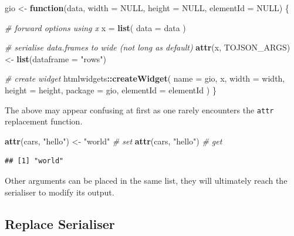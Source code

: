 \documentclass[
]{krantz}
\makeatletter
\newenvironment{Shaded}{\begin{snugshade}}{\end{snugshade}}
\newcommand{\CommentTok}[1]{\textcolor[rgb]{0.37,0.37,0.37}{\textit{#1}}}
\newcommand{\ControlFlowTok}[1]{\textcolor[rgb]{0.27,0.27,0.27}{\textbf{#1}}}
\newcommand{\DataTypeTok}[1]{\textcolor[rgb]{0.27,0.27,0.27}{#1}}
\newcommand{\KeywordTok}[1]{\textcolor[rgb]{0.27,0.27,0.27}{\textbf{#1}}}
\newcommand{\NormalTok}[1]{#1}
\newcommand{\OperatorTok}[1]{\textcolor[rgb]{0.43,0.43,0.43}{\textbf{#1}}}
\newcommand{\OtherTok}[1]{\textcolor[rgb]{0.37,0.37,0.37}{#1}}
\newcommand{\StringTok}[1]{\textcolor[rgb]{0.5,0.5,0.5}{#1}}
\newenvironment{kframe}{%
\medskip{}
\setlength{\fboxsep}{.8em}
 \def\at@end@of@kframe{}%
 \ifinner\ifhmode%
  \def\at@end@of@kframe{\end{minipage}}%
  \begin{minipage}{\columnwidth}%
 \fi\fi%
 \def\FrameCommand##1{\hskip\@totalleftmargin \hskip-\fboxsep
 \colorbox{shadecolor}{##1}\hskip-\fboxsep
     \hskip-\linewidth \hskip-\@totalleftmargin \hskip\columnwidth}%
 \MakeFramed {\advance\hsize-\width
   \@totalleftmargin\z@ \linewidth\hsize
   \@setminipage}}%
 {\par\unskip\endMakeFramed%
 \at@end@of@kframe}
\renewenvironment{Shaded}{\begin{kframe}}{\end{kframe}}
\makeatother
\begin{document}
\begin{Shaded}
\begin{Highlighting}[]
\NormalTok{gio <{-}}\StringTok{ }\ControlFlowTok{function}\NormalTok{(data, }\DataTypeTok{width =} \OtherTok{NULL}\NormalTok{, }\DataTypeTok{height =} \OtherTok{NULL}\NormalTok{, }
  \DataTypeTok{elementId =} \OtherTok{NULL}\NormalTok{) \{}

  \CommentTok{\# forward options using x}
\NormalTok{  x =}\StringTok{ }\KeywordTok{list}\NormalTok{(}
    \DataTypeTok{data =}\NormalTok{ data}
\NormalTok{  )}

  \CommentTok{\# serialise data.frames to wide (not long as default)}
  \KeywordTok{attr}\NormalTok{(x, }\StringTok{\textquotesingle{}TOJSON\_ARGS\textquotesingle{}}\NormalTok{) <{-}}\StringTok{ }\KeywordTok{list}\NormalTok{(}\DataTypeTok{dataframe =} \StringTok{"rows"}\NormalTok{)}

  \CommentTok{\# create widget}
\NormalTok{  htmlwidgets}\OperatorTok{::}\KeywordTok{createWidget}\NormalTok{(}
    \DataTypeTok{name =} \StringTok{\textquotesingle{}gio\textquotesingle{}}\NormalTok{,}
\NormalTok{    x,}
    \DataTypeTok{width =}\NormalTok{ width,}
    \DataTypeTok{height =}\NormalTok{ height,}
    \DataTypeTok{package =} \StringTok{\textquotesingle{}gio\textquotesingle{}}\NormalTok{,}
    \DataTypeTok{elementId =}\NormalTok{ elementId}
\NormalTok{  )}
\NormalTok{\}}
\end{Highlighting}
\end{Shaded}

The above may appear confusing at first as one rarely encounters the \texttt{attr} replacement function.

\begin{Shaded}
\begin{Highlighting}[]
\KeywordTok{attr}\NormalTok{(cars, }\StringTok{"hello"}\NormalTok{) <{-}}\StringTok{ "world"} \CommentTok{\# set }
\KeywordTok{attr}\NormalTok{(cars, }\StringTok{"hello"}\NormalTok{) }\CommentTok{\# get }
\end{Highlighting}
\end{Shaded}

\begin{verbatim}
## [1] "world"
\end{verbatim}

Other arguments can be placed in the same list, they will ultimately reach the serialiser to modify its output.

\hypertarget{widgets-full-transform-data-replace}{%
\subsection{Replace Serialiser}\label{widgets-full-transform-data-replace}}
\end{document}
